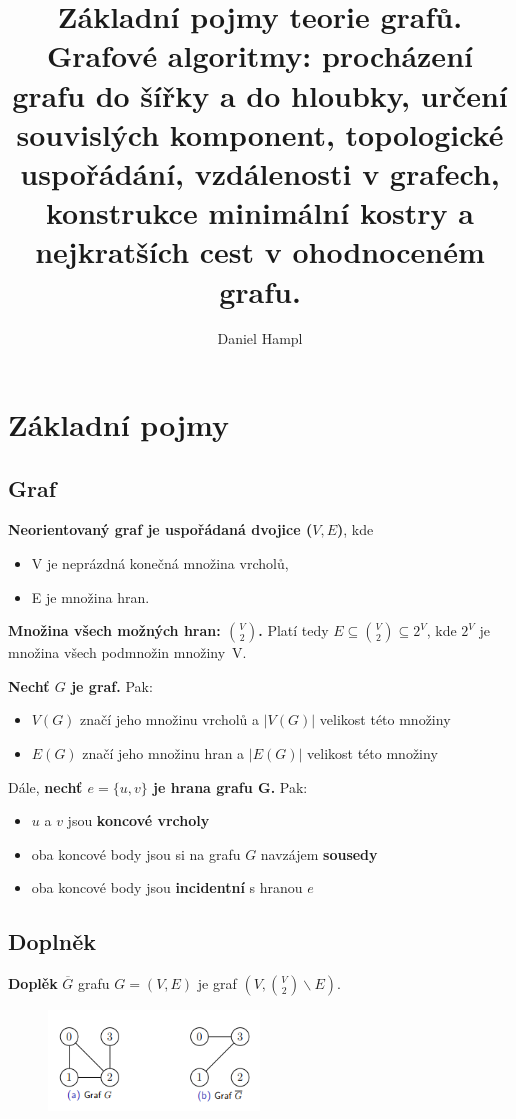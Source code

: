 \documentclass{szzclass}
\title{Základní pojmy teorie grafů. Grafové algoritmy: procházení grafu do šířky a do hloubky, určení souvislých komponent,   topologické uspořádání, vzdálenosti v grafech, konstrukce minimální kostry a nejkratších cest v ohodnoceném grafu.}
\author{Daniel Hampl}
\begin{document}
\maketitle

\tableofcontents
\newpage

\section{Základní pojmy}

\subsection{Graf}

\textbf{Neorientovaný graf je uspořádaná dvojice ($V, E$)}, kde
\begin{itemize}
    \item V je neprázdná konečná množina vrcholů,
    \item E je množina hran.
\end{itemize}

\textbf{Množina všech možných hran: $\binom{V}{2}$.}\newline
Platí tedy $E \subseteq \binom{V}{2} \subseteq 2^V$, kde $2^V$ je množina všech podmnožin množiny~V.

\textbf{Nechť $G$ je graf.} Pak:
\begin{itemize}
    \item $V(G)$ značí jeho množinu vrcholů a $|V(G)|$  velikost této množiny
    \item $E(G)$ značí jeho množinu hran a $|E(G)|$  velikost této množiny
\end{itemize}

Dále, \textbf{nechť $e = \{u, v\}$ je hrana grafu G.} Pak:
\begin{itemize}
    \item $u$ a $v$ jsou \textbf{koncové vrcholy}
    \item oba koncové body jsou si na grafu $G$ navzájem \textbf{sousedy}
    \item oba koncové body jsou \textbf{incidentní} s hranou $e$
\end{itemize}

\subsection{Doplněk}
\textbf{Doplěk} $\overline{G}$ grafu $G = (V, E)$ je graf $(V, \binom{V}{2} \backslash E)$.

\begin{figure}[h]
\includegraphics[width=0.5\textwidth]{topics/bi-spol-4/images/doplnek.png}
\end{figure}
\end{document}
